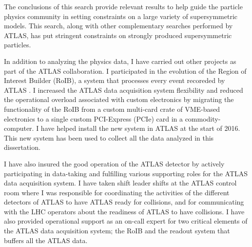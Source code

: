 The conclusions of this search provide relevant results to help guide the particle physics 
community in setting constraints on a large variety of supersymmetric models. 
This search, along with other complementary searches performed by ATLAS, has
put stringent constraints on strongly produced supersymmetric particles.


In addition to analyzing the physics data, I have carried out other projects as part of the ATLAS collaboration.
I participated in the evolution of the Region of Interest Builder (RoIB), a system that processes 
every event recoreded by ATLAS \cite{pcroib_orifki}. 
I increased the ATLAS data acquisition system flexibility and reduced the operational overload associated 
with custom electronics 
by migrating the functionality of the RoIB from a custom multi-card crate of VME-based electronics to a single custom PCI-Express 
(PCIe) card in a commodity-computer. I have helped install the new system in ATLAS at the start of 2016.
This new system has been used to collect all the data analyzed in this dissertation.

I have also insured the good operation of the ATLAS detector by actively participating in data-taking and fulfilling various 
supporting roles for the ATLAS data acquisition system. I have taken shift leader shifts at the ATLAS control room 
where I was responsible for coordinating the activities of the different detectors of ATLAS to have ATLAS ready for collisions,
and for communicating with the LHC operators about the readiness of ATLAS to have collisions. I have also provided 
operational support as an on-call expert for two critical elements of the ATLAS data acquisition system; the RoIB and 
the readout system that buffers all the ATLAS data.

